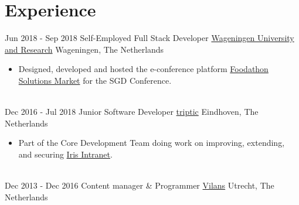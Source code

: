 \documentclass[letterpaper]{twentysecondcv} %
\begin{document}


\section{Experience}
\begin{twenty} %
    \twentyitem
    	{Jun 2018 -}
		{Sep 2018}
        {Self-Employed Full Stack Developer}
		{\href{https://wur.nl}{Wageningen University and Research}}
        {Wageningen, The Netherlands}
        {
        \begin{itemize}
			\item Designed, developed and hosted the e-conference platform \href{https://foodathon-solutionsmarket.com/}{Foodathon Solutions Market} for the SGD Conference.
        \end{itemize}
        }
        \\
    \twentyitem
    	{Dec 2016 -}
		{Jul 2018}
        {Junior Software Developer}
		{\href{http://triptic.nl}{triptic}}
        {Eindhoven, The Netherlands}
        {
        \begin{itemize}
            \item Part of the Core Development Team doing work on improving, extending, and securing \href{https://www.irisintranet.com/}{Iris Intranet}.
        \end{itemize}
        }
        \\
	\twentyitem
    	{Dec 2013 -}
		{Dec 2016}
		{Content manager \& Programmer}
		{\href{http://www.vilans.nl/}{Vilans}}
        {Utrecht, The Netherlands}
        {}
\end{twenty}

\end{document}
